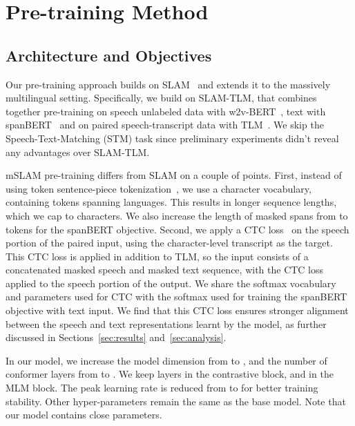 \documentclass[nohyperref]{article}
\newcommand{\mslam}{mSLAM}
\begin{document}
\section{Pre-training Method}
\label{sec:pretraining}

\subsection{Architecture and Objectives}
\label{subsec:pretrain-arch}

Our pre-training approach builds on SLAM~\citep{bapna2021slam} and extends it to the massively multilingual setting. Specifically, we build on SLAM-TLM, that combines together pre-training on speech unlabeled data with w2v-BERT~\cite{chung2021w2v}, text with spanBERT~\cite{Joshi2020SpanBERTIP} and on paired speech-transcript data with TLM~\cite{conneau2019cross}. We skip the Speech-Text-Matching (STM) task since preliminary experiments didn't reveal any advantages over SLAM-TLM.




\mslam{} pre-training differs from SLAM on a couple of points. First, instead of using  token sentence-piece tokenization~\citep{kudo-richardson-2018-sentencepiece}, we use a character vocabulary, containing  tokens spanning  languages. This results in longer sequence lengths, which we cap to  characters. We also increase the length of masked spans from  to  tokens for the spanBERT objective. Second, we apply a CTC loss~\citep{graves2006connectionist,graves2014towards} on the speech portion of the paired input, using the character-level transcript as the target. This CTC loss is applied in addition to TLM, so the input consists of a concatenated masked speech and masked text sequence, with the CTC loss applied to the speech portion of the output. We share the softmax vocabulary and parameters used for CTC with the softmax used for training the spanBERT objective with text input. We find that this CTC loss ensures stronger alignment between the speech and text representations learnt by the model, as further discussed in Sections~\ref{sec:results} and~\ref{sec:analysis}.

In our  model, we increase the model dimension from  to , and the number of conformer layers from  to . We keep  layers in the contrastive block, and  in the MLM block. The peak learning rate is reduced from  to  for better training stability. Other hyper-parameters remain the same as the base  model. Note that our  model contains close  parameters.
\end{document}
